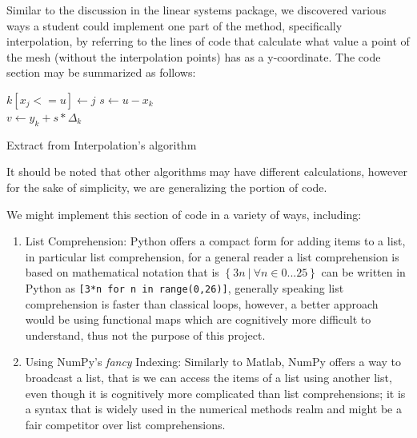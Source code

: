 Similar to the discussion in the linear systems package, we discovered various ways a student could implement one part of the method, specifically interpolation, by referring to the lines of code that calculate what value a point of the mesh (without the interpolation points) has as a y-coordinate. The code section may be summarized as follows: 



\begin{algorithm}[H]
\SetAlgoLined
{} {
$k[x_j <= u] \gets j$
}
$s \gets u - x_k$\\
$v \gets y_k + s * \Delta_k$

\caption{Extract from Interpolation's algorithm}
\end{algorithm}
It should be noted that other algorithms may have different calculations, however for the sake of simplicity, we are generalizing the portion of code.


We might implement this section of code in a variety of ways, including:
\begin{enumerate}
    \item List Comprehension: Python offers a compact form for adding items to a list, in particular list comprehension, for a general reader a list comprehension is based on mathematical notation that is $\left\{ 3n\ |\ \forall n\in 0...25\right\}$ can be written in Python as \lstinline|[3*n for n in range(0,26)]|, generally speaking list comprehension is faster than classical loops\cite{PythonSpeedPerformanceTips}, however, a better approach would be using functional maps which are cognitively more difficult to understand, thus not the purpose of this project.

    \item Using NumPy's \textit{fancy} Indexing: Similarly to Matlab, NumPy offers a way to broadcast a list, that is we can access the items of a list using another list, even though it is cognitively more complicated than list comprehensions; it is a syntax that is widely used in the numerical methods realm and might be a fair competitor over list comprehensions.
    
\end{enumerate}

